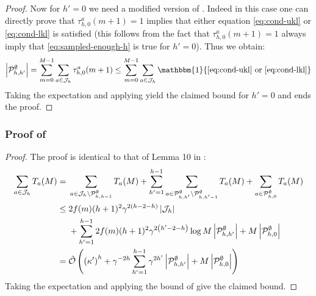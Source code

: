 \begin{proof}
	Now for $h' = 0$ we need a modified version of . Indeed in this case one can directly prove that $\tau_{h,0}^a(m+1)=1$ implies that either equation \eqref{eq:cond-ukl} or \eqref{eq:cond-lkl} is satisfied (this follows from the fact that $\tau_{h,0}^a(m+1)=1$ always imply that \eqref{eq:sampled-enough-h} is true for $h'= 0$). Thus we obtain:
	\begin{equation*}
	\left|\mathcal{P}_{h, h^{\prime}}^{\emptyset}\right|=\sum_{m=0}^{M-1} \sum_{a \in \mathcal{J}_{h}} \tau_{h, 0}^{a}(m+1) \leq \sum_{m=0}^{M-1} \sum_{a \in \mathcal{J}_{h}} \mathbbm{1}\{\eqref{eq:cond-ukl}\text{ or }\eqref{eq:cond-lkl}\}
	\end{equation*}
	Taking the expectation and applying  yield the claimed bound for $h' = 0$ and ends the proof.
	
\end{proof}

\subsubsection{Proof of }
\label{sec:proof-expected-plays-count}
\begin{proof}
	The proof is identical to that of Lemma 10 in \citep{Bubeck2010}:
	\begin{align*}
	\sum_{a \in \mathcal{J}_{h}} T_{a}(M) = {} & \sum_{a \in \mathcal{J}_{h} \backslash \mathcal{P}_{h, h-1}^{\emptyset}} T_{a}(M)+\sum_{h^{\prime}=1}^{h-1} \sum_{a \in \mathcal{P}_{h, h^{\prime}}^{\emptyset} \setminus \mathcal{P}_{h, h^{\prime}-1}^{\emptyset}} T_{a}(M)+\sum_{a \in \mathcal{P}_{h, 0}^{\emptyset}} T_{a}(M)\\
	\leq {} & 2f(m)(h+1)^{2} \gamma^{2(h-2-h)}\left|\mathcal{J}_{h}\right| \\
	 &+ \sum_{h^{\prime}=1}^{h-1} 2f(m)(h+1)^{2} \gamma^{2\left(h^{\prime}-2-h\right)} \log M\left|\mathcal{P}_{h, h^{\prime}}^{\emptyset}\right|+M\left|\mathcal{P}_{h, 0}^{\emptyset}\right|\\
	= {} &\tilde{\mathcal{O}}\left(\left(\kappa^{\prime}\right)^{h}+\gamma^{-2 h} \sum_{h^{\prime}=1}^{h-1} \gamma^{2 h^{\prime}}\left|\mathcal{P}_{h, h^{\prime}}^{\emptyset}\right|+M\left|\mathcal{P}_{h, 0}^{\emptyset}\right|\right)
	\end{align*}
	Taking the expectation and applying the bound of  give the claimed bound.
	
\end{proof}


